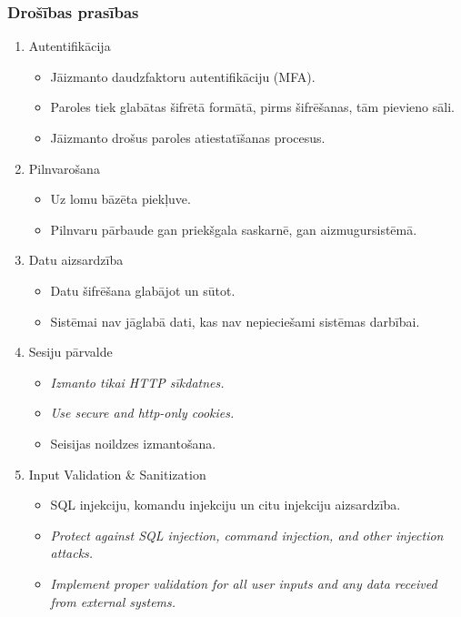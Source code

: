 \subsubsection{Drošības prasības}
\begin{enumerate}
	\item Autentifikācija
	      \begin{itemize}
		      \item Jāizmanto daudzfaktoru autentifikāciju (MFA).
		      \item Paroles tiek glabātas šifrētā formātā, pirms šifrēšanas, tām  pievieno sāli.
		      \item Jāizmanto drošus paroles atiestatīšanas procesus.
	      \end{itemize}
	\item Pilnvarošana
	      \begin{itemize}
		      \item Uz lomu bāzēta piekļuve.
		      \item Pilnvaru pārbaude gan priekšgala saskarnē, gan aizmugursistēmā.
	      \end{itemize}
	\item Datu aizsardzība
	      \begin{itemize}
		      \item Datu šifrēšana glabājot un sūtot.
		      \item Sistēmai nav jāglabā dati, kas nav nepieciešami sistēmas darbībai.
	      \end{itemize}
	\item Sesiju pārvalde
	      \begin{itemize}
		      \item \textit{Izmanto tikai HTTP sīkdatnes.}
		      \item \textit{Use secure and http-only cookies.}
		      \item Seisijas noildzes izmantošana.
	      \end{itemize}
	\item Input Validation \& Sanitization
	      \begin{itemize}
		      \item SQL injekciju, komandu injekciju un citu injekciju aizsardzība.
		      \item \textit{Protect against SQL injection, command injection, and other injection attacks.}
		      \item \textit{Implement proper validation for all user inputs and any data received from external systems.}
	      \end{itemize}

\end{enumerate}
